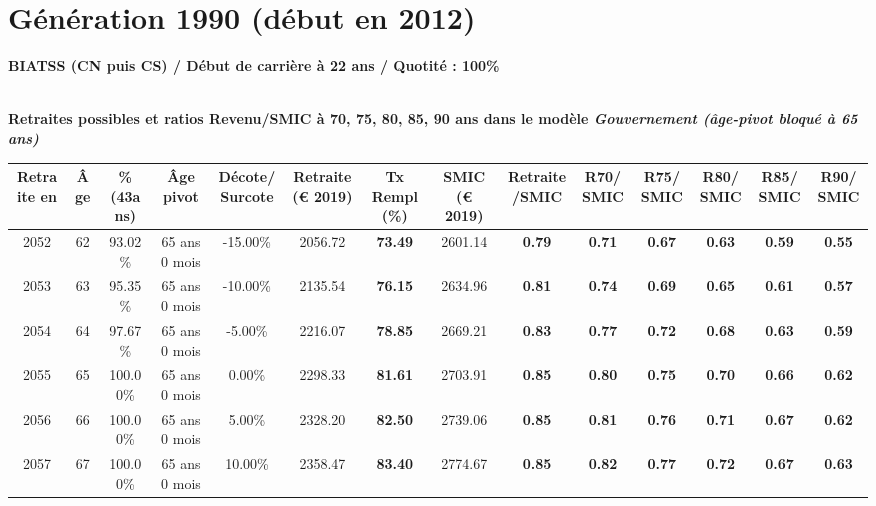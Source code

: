 \newpage 
 
\section{Génération 1990 (début en 2012)\label{BIATSS_100_1990_22_0}} 
 
{\bf \noindent BIATSS (CN puis CS) / Début de carrière à 22 ans / Quotité : 100\%}  ~ 

 ~\\{\bf \noindent Retraites possibles et ratios Revenu/SMIC à 70, 75, 80, 85, 90 ans dans le modèle \emph{Gouvernement (âge-pivot bloqué à 65 ans)}}  
 
\begin{adjustbox}{max width=\textwidth} 
\begin{tabular}[htb]{|c|c||c|c|c||c|c||c|c||c|c|c|c|c|} 
\hline 
 Retraite en &  Âge &  \%(43ans) &  Âge pivot &  Décote/Surcote &  Retraite (\euro{} 2019) &  Tx Rempl(\%) &  SMIC (\euro{} 2019) &  Retraite/SMIC &  R70/SMIC &  R75/SMIC &  R80/SMIC &  R85/SMIC &  R90/SMIC \\ 
\hline \hline 
 2052 &  62 &  93.02\% &  65 ans 0 mois &  -15.00\% &  2056.72 &  {\bf 73.49} &  2601.14 &  {\bf {\color{red} 0.79}} &  {\bf {\color{red} 0.71}} &  {\bf {\color{red} 0.67}} &  {\bf {\color{red} 0.63}} &  {\bf {\color{red} 0.59}} &  {\bf {\color{red} 0.55}} \\ 
\hline 
 2053 &  63 &  95.35\% &  65 ans 0 mois &  -10.00\% &  2135.54 &  {\bf 76.15} &  2634.96 &  {\bf {\color{red} 0.81}} &  {\bf {\color{red} 0.74}} &  {\bf {\color{red} 0.69}} &  {\bf {\color{red} 0.65}} &  {\bf {\color{red} 0.61}} &  {\bf {\color{red} 0.57}} \\ 
\hline 
 2054 &  64 &  97.67\% &  65 ans 0 mois &  -5.00\% &  2216.07 &  {\bf 78.85} &  2669.21 &  {\bf {\color{red} 0.83}} &  {\bf {\color{red} 0.77}} &  {\bf {\color{red} 0.72}} &  {\bf {\color{red} 0.68}} &  {\bf {\color{red} 0.63}} &  {\bf {\color{red} 0.59}} \\ 
\hline 
 2055 &  65 &  100.00\% &  65 ans 0 mois &  0.00\% &  2298.33 &  {\bf 81.61} &  2703.91 &  {\bf {\color{red} 0.85}} &  {\bf {\color{red} 0.80}} &  {\bf {\color{red} 0.75}} &  {\bf {\color{red} 0.70}} &  {\bf {\color{red} 0.66}} &  {\bf {\color{red} 0.62}} \\ 
\hline 
 2056 &  66 &  100.00\% &  65 ans 0 mois &  5.00\% &  2328.20 &  {\bf 82.50} &  2739.06 &  {\bf {\color{red} 0.85}} &  {\bf {\color{red} 0.81}} &  {\bf {\color{red} 0.76}} &  {\bf {\color{red} 0.71}} &  {\bf {\color{red} 0.67}} &  {\bf {\color{red} 0.62}} \\ 
\hline 
 2057 &  67 &  100.00\% &  65 ans 0 mois &  10.00\% &  2358.47 &  {\bf 83.40} &  2774.67 &  {\bf {\color{red} 0.85}} &  {\bf {\color{red} 0.82}} &  {\bf {\color{red} 0.77}} &  {\bf {\color{red} 0.72}} &  {\bf {\color{red} 0.67}} &  {\bf {\color{red} 0.63}} \\ 
\hline 
\hline 
\end{tabular} 
\end{adjustbox} 
 
